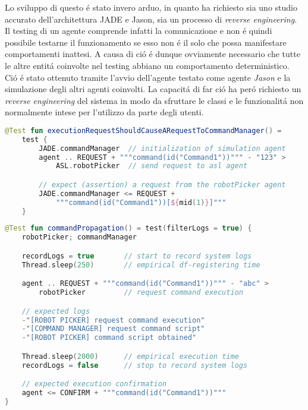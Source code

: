 Lo sviluppo di questo \'e stato invero arduo, in quanto ha richiesto sia uno studio accurato dell'architettura JADE e Jason, sia un processo di \textit{reverse engineering}. Il testing di un agente comprende infatti la comunicazione e non \'e quindi possibile testarne il funzionamento se esso non \'e il solo che possa manifestare comportamenti inattesi. A causa di ci\'o \'e dunque ovviamente necessario che tutte le altre entit\'a coinvolte nel testing abbiano un comportamento deterministico. Ci\'o \'e stato ottenuto tramite l'avvio dell'agente testato come agente \textit{Jason} e la simulazione degli altri agenti coinvolti. La capacit\'a di far ci\'o ha per\'o richiesto un \textit{reverse engineering} del sistema in modo da sfruttare le classi e le funzionalit\'a non normalmente intese per l'utilizzo da parte degli utenti.

\begin{lstlisting}[language=Kotlin, caption=Esempio di test `basato sulla comunicazione' permesso dall'utilizzo del framework, label=listing:communication-testing]
@Test fun executionRequestShouldCauseARequestToCommandManager() = 
    test {
        JADE.commandManager  // initialization of simulation agent
        agent .. REQUEST + """command(id("Command1"))""" - "123" >
            ASL.robotPicker  // send request to asl agent

        // expect (assertion) a request from the robotPicker agent
        JADE.commandManager <= REQUEST +
            """command(id("Command1"))[${mid(1)}]"""
    }
\end{lstlisting}

\begin{lstlisting}[language=Kotlin, caption=Esempio di test `basato sul logging' permesso dall'utilizzo del framework, label=listing:logging-testing]
@Test fun commandPropagation() = test(filterLogs = true) {
    robotPicker; commandManager

    recordLogs = true       // start to record system logs
    Thread.sleep(250)       // empirical df-registering time

    agent .. REQUEST + """command(id("Command1"))""" - "abc" >
        robotPicker         // request command execution

    // expected logs
    -"[ROBOT PICKER] request command execution"
    -"[COMMAND MANAGER] request command script"
    -"[ROBOT PICKER] command script obtained"

    Thread.sleep(2000)      // empirical execution time
    recordLogs = false      // stop to record system logs

    // expected execution confirmation
    agent <= CONFIRM + """command(id("Command1"))"""
}
\end{lstlisting}
